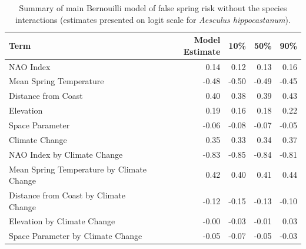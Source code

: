 \documentclass{article}\usepackage[]{graphicx}\usepackage[]{color}
\begin{document}
\begin{table}[H]
\centering
\caption{Summary of main Bernouilli model of false spring risk without the species interactions (estimates presented on logit scale for \textit{Aesculus hippocastanum}).} 
\begin{tabular}{lrrrr}
  \hline
Term & Model Estimate & 10\% & 50\% & 90\% \\ 
  \hline
NAO Index & 0.14 & 0.12 & 0.13 & 0.16 \\ 
  Mean Spring 
Temperature & -0.48 & -0.50 & -0.49 & -0.45 \\ 
  Distance from 
Coast & 0.40 & 0.38 & 0.39 & 0.43 \\ 
  Elevation & 0.19 & 0.16 & 0.18 & 0.22 \\ 
  Space Parameter & -0.06 & -0.08 & -0.07 & -0.05 \\ 
  Climate Change & 0.35 & 0.33 & 0.34 & 0.37 \\ 
  NAO Index by Climate Change & -0.83 & -0.85 & -0.84 & -0.81 \\ 
  Mean Spring 
Temperature by Climate Change & 0.42 & 0.40 & 0.41 & 0.44 \\ 
  Distance from 
Coast by Climate Change & -0.12 & -0.15 & -0.13 & -0.10 \\ 
  Elevation by Climate Change & -0.00 & -0.03 & -0.01 & 0.03 \\ 
  Space Parameter by Climate Change & -0.05 & -0.07 & -0.05 & -0.03 \\ 
   \hline
\end{tabular}
\end{table}
\end{document}
